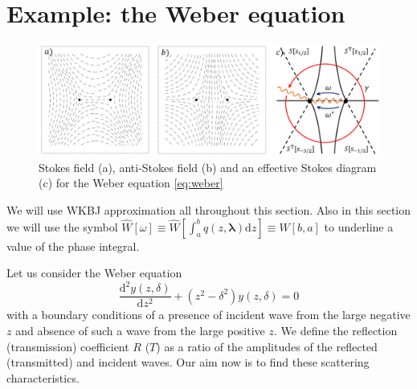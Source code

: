 \documentclass[atmp]{ipart_v1}
\def\rmd{\mathrm{d}}
\def\W{\widehat{W}}
\def\lmbd{\bm{\lambda}}
\def\w{\omega}
\newcommand\eref[1]{\eqref{#1}}
\newcommand\phsintgrnd[1][z]{q(#1,\lmbd)}
\newcommand\phsintgrl[3][z]{\int_{#2}^{#3} \phsintgrnd[#1] \rmd #1}
\begin{document}
\section{Example: the Weber equation \label{sec:weber}}

\begin{figure}
\centering
\noindent
\includegraphics[width=\textwidth]{stuff/wsd.png}
\caption{Stokes field (a), anti-Stokes field (b) and an effective Stokes diagram (c) 
for the Weber equation \eref{eq:weber}}
\label{fig:wsd}
\end{figure} 

We will use WKBJ approximation all throughout this section. Also in this section we will use the symbol 
$\W[\w] \equiv \W \left[\phsintgrl{a}{b} \right] \equiv \W[b,a]$ to underline a value of the phase integral. 

Let us consider the Weber equation
\begin{equation}
\frac{\rmd^2 y(z,\delta)}{\rmd z^2}+(z^2-\delta^2)y(z,\delta)=0
\label{eq:weber}
\end{equation}
with a boundary conditions of a presence of incident wave from the large negative $z$ and absence of such 
a wave from the large positive $z$. We define the reflection (transmission) coefficient $R$ ($T$) as
a ratio of the amplitudes of the reflected (transmitted) and incident waves. 
Our aim now is to find these scattering characteristics.
\end{document}
